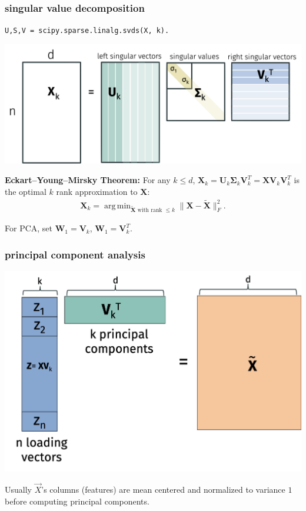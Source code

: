 \documentclass[handout,compress]{beamer}
\newcommand{\bs}[1]{\boldsymbol{#1}}
\newcommand{\bv}[1]{\mathbf{#1}}
\DeclareMathOperator*{\argmin}{arg\,min}
\begin{document}
\begin{frame}[t]
	\frametitle{singular value decomposition}
	\small
	\texttt{U,S,V = scipy.sparse.linalg.svds(X, k).} 
	\begin{center}
		\includegraphics[width=.9\textwidth]{svdk.png}
	\end{center} 
	\textbf{Eckart–Young–Mirsky Theorem:} For any $k \leq d$, $\bv{X}_k = \bv{U}_k\bs{\Sigma}_k\bv{V}_k^T = \bv{X}\bv{V}_k\bv{V}_k^T $ is the optimal $k$ rank approximation to $\bv{X}$:
	\begin{align*}
	\bv{X}_k = 	\argmin_{\tilde{\bv{X}} \text{ with rank $\leq k$} } \|\bv{X} - \tilde{\bv{X}}\|_F^2.
	\end{align*}
	
	For PCA, set $\bv{W}_1 = \bv{V}_k$, $\bv{W}_1 = \bv{V}_k^T$.
\end{frame}

\begin{frame}[t]
	\frametitle{principal component analysis}
	\begin{center}
		\includegraphics[width=.8\textwidth]{pca.png}
	\end{center} 
Usually $\vec{X}$'s columns (features) are mean centered and normalized to variance $1$ before computing principal components.
\end{frame}
\end{document}
